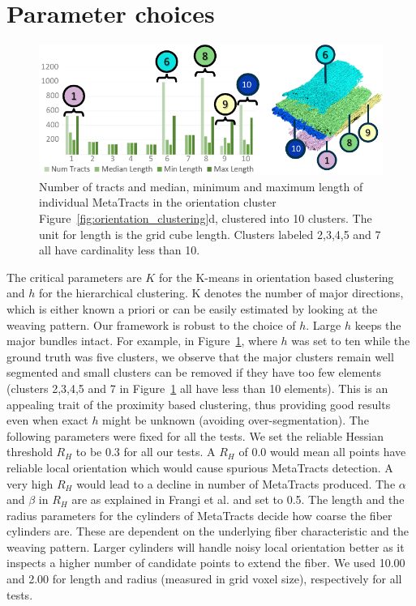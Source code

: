 \section{Parameter choices}
\label{sec:param_choices}
\begin{figure}[tb]
\centering
	\includegraphics[width=\linewidth,  trim = 0mm 0mm 0mm 00mm, clip]{images_pvis/figure9_AMA.pdf}
	 \vspace{-1.5em}
	\caption{Number of tracts and median, minimum and maximum length of individual MetaTracts in the orientation cluster Figure~\ref{fig:orientation_clustering}d, clustered into 10 clusters. The unit for length is the grid cube length.  Clusters labeled 2,3,4,5 and 7 all have cardinality less than 10. }
	\label{fig:len_dist_crop16}
\end{figure}
The critical parameters are $K$ for the K-means in orientation based clustering and $h$ for the hierarchical clustering. K denotes the number of major directions, which is either known a priori or can be easily estimated by looking at the weaving pattern. 
Our framework is robust to the choice of $h$. Large $h$ keeps the major bundles intact. For example, in  Figure~\ref{fig:len_dist_crop16}, where $h$ was set to ten while the ground truth was five clusters, we observe that the major clusters remain well segmented and small clusters can be removed if they have too few elements (clusters 2,3,4,5 and 7 in Figure~\ref{fig:len_dist_crop16} all have less than 10 elements). This is an appealing trait of the proximity based clustering, thus providing good results even when exact $h$ might be unknown (avoiding over-segmentation).
The following parameters were fixed for all the tests. We set the reliable Hessian threshold $R_{H}$ to be 0.3 for all our tests. A $R_{H}$ of 0.0 would mean all points have reliable local orientation which would cause spurious MetaTracts detection. A very high $ R_{H}$ would lead to a decline in number of MetaTracts produced. The $\alpha$ and $\beta$ in $R_{H}$ are as explained in Frangi et al. \cite{Frangi1998} and set to 0.5. The length and the radius parameters for the cylinders of MetaTracts decide how coarse the fiber cylinders are. These are dependent on the underlying fiber characteristic and the weaving pattern. Larger cylinders will handle noisy local orientation better as it inspects a higher number of candidate points to extend the fiber. We used 10.00 and 2.00 for length and radius (measured in grid voxel size), respectively for all tests.  
